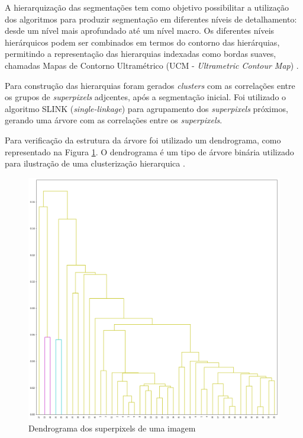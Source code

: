 \begin{document}
A hierarquização das segmentações tem como objetivo possibilitar a utilização dos algoritmos para produzir segmentação em diferentes níveis de detalhamento: desde um nível mais aprofundado até um nível macro. Os diferentes níveis hierárquicos podem ser combinados em termos do contorno das hierárquias, permitindo a representação das hierarquias indexadas como bordas suaves, chamadas Mapas de Contorno Ultramétrico (UCM - \textit{Ultrametric Contour Map}) \cite{ULTRAMETRIC}.

Para construção das hierarquias foram gerados \textit{clusters} com as correlações entre os grupos de \textit{superpixels} adjcentes, após a segmentação inicial. Foi utilizado o algoritmo SLINK (\textit{single-linkage}) para agrupamento dos \textit{superpixels} próximos, gerando uma árvore com as correlações entre os \textit{superpixels}.

Para verificação da estrutura da árvore foi utilizado um dendrograma, como representado na Figura \ref{fig:DENDROGRAM}. O dendrograma é um tipo de árvore binária utilizado para ilustração de uma clusterização hierarquica \cite{SINGLE_LINKAGE}.

\begin{figure}[ht]
\centering
\includegraphics[width=1.\textwidth]{dendrogram.png}
\caption{Dendrograma dos superpixels de uma imagem}
\label{fig:DENDROGRAM}
\end{figure}
\end{document}
